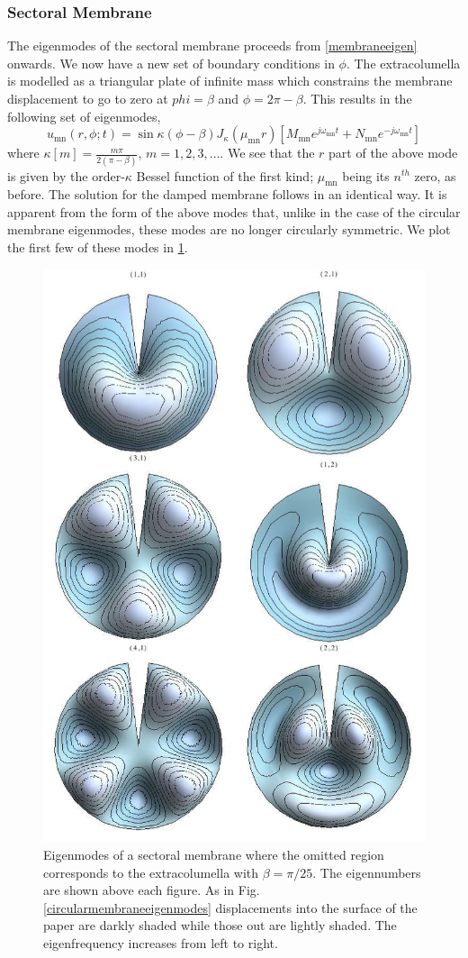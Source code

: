 \subsubsection{Sectoral Membrane}
The eigenmodes of the sectoral membrane proceeds from \eqref{membraneeigen} onwards. We now have a new set of boundary conditions in $\phi$.
The extracolumella is modelled as a triangular plate of infinite mass which constrains the membrane displacement to go to zero at $phi=\beta$
and $\phi=2\pi-\beta$. This results in the following set of eigenmodes,
\begin{equation}\label{sectoraleigenmode}
 u_{\mathrm{mn}}(r,\phi;t)=\sin \kappa(\phi-\beta) J_\kappa(\mu_{\mathrm{mn}} r)\left[M_{\mathrm{mn}}e^{j\omega_{\mathrm{mn}} t}+N_{\mathrm{mn}}e^{-j\omega_{\mathrm{mn}} t}\right]
\end{equation}
where $\kappa[m]=\frac{m\pi}{2(\pi-\beta)}$, $m=1,2,3,\ldots$. We see that the $r$ part of the above mode is given by the
order-$\kappa$ Bessel function of the first kind; $\mu_{\mathrm{mn}}$ being its $n^{th}$ zero, as before. The solution for the damped
membrane follows in an identical way.
It is apparent from the form of the above modes that, unlike in the case of the circular membrane eigenmodes, these modes
are no longer circularly symmetric. We plot the first few of these modes in \ref{sectoralmembraneeigenmodes}. 
\begin{figure}[ht!]
 \centering
 \includegraphics[width=.6\linewidth]{Diagrams/SectorMembraneModes/membrane_modes_all.png}
 \caption[Sectoral membrane eigenmodes]{Eigenmodes of a sectoral membrane where the omitted region corresponds to the extracolumella with $\beta=\pi/25$. The eigennumbers are
 shown above each figure.
 As in Fig. \ref{circularmembraneeigenmodes} displacements into the surface of the paper are darkly shaded while those out are lightly shaded. The eigenfrequency increases from left to right.}
  \label{sectoralmembraneeigenmodes}
\end{figure}
